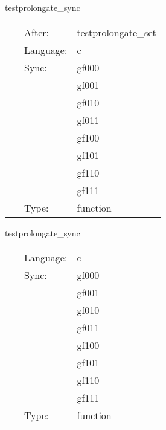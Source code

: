 \vspace{5mm}


\hspace{5mm} testprolongate\_sync 

\hspace{5mm}{\it sync test data } 


\hspace{5mm}

 \begin{tabular*}{160mm}{cll} 
~ & After:  & testprolongate\_set \\ 
~ & Language:  & c \\ 
~ & Sync:  & gf000 \\ 
~& ~ &gf001\\ 
~& ~ &gf010\\ 
~& ~ &gf011\\ 
~& ~ &gf100\\ 
~& ~ &gf101\\ 
~& ~ &gf110\\ 
~& ~ &gf111\\ 
~ & Type:  & function \\ 
\end{tabular*} 


\vspace{5mm}


\hspace{5mm} testprolongate\_sync 

\hspace{5mm}{\it sync test data } 


\hspace{5mm}

 \begin{tabular*}{160mm}{cll} 
~ & Language:  & c \\ 
~ & Sync:  & gf000 \\ 
~& ~ &gf001\\ 
~& ~ &gf010\\ 
~& ~ &gf011\\ 
~& ~ &gf100\\ 
~& ~ &gf101\\ 
~& ~ &gf110\\ 
~& ~ &gf111\\ 
~ & Type:  & function \\ 
\end{tabular*} 


\vspace{5mm}

